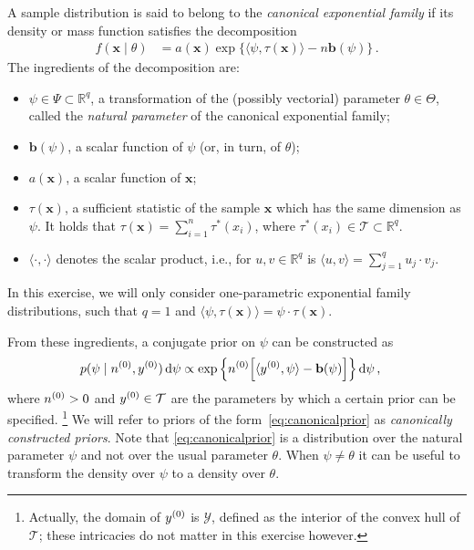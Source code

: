 \documentclass[12pt,a4paper	,twoside]{article}
\newcommand{\reals}{\mathbb{R}}
\newcommand{\dd}{\,\mathrm{d}}
\newcommand{\mbf}[1]{\mathbf{#1}}
\newcommand{\bs}[1]{\boldsymbol{#1}}
\renewcommand{\vec}[1]{{\bs#1}}
\begin{document}
A sample distribution is said to belong to the \emph{canonical exponential family}
if its density or mass function satisfies the decomposition
\begin{align}
f(\vec{x} \mid \theta) &= a(\vec{x})\exp\big\{\langle \psi, \tau(\vec{x}) \rangle - n \mbf{b}(\psi)\big\}\,.
\label{eq:expofam-sampledens}
\end{align}
The ingredients of the decomposition are:
\begin{itemize}
\item $\psi \in \Psi \subset \reals^q$, a transformation of the (possibly vectorial) parameter $\theta \in \Theta$,
called the \emph{natural parameter} of the canonical exponential family;
\item $\mbf{b}(\psi)$, a scalar function of $\psi$ (or, in turn, of $\theta$);
\item $a(\vec{x})$, a scalar function of $\vec{x}$;
\item $\tau(\vec{x})$, a sufficient statistic of the sample $\vec{x}$ which has the same dimension as $\psi$.
It holds that $\tau(\vec{x}) = \sum_{i=1}^n \tau^*(x_i)$,
where $\tau^*(x_i) \in \mathcal{T} \subset \reals^q$.
\item $\langle\cdot, \cdot\rangle$ denotes the scalar product,
i.e., for $u, v \in \reals^q$ is $\langle u, v\rangle = \sum_{j=1}^q u_j \cdot v_j$.
\end{itemize}
In this exercise, we will only consider one-parametric exponential family distributions,
such that $q=1$ and $\langle \psi, \tau(\vec{x}) \rangle = \psi \cdot \tau(\vec{x})$.

From these ingredients, a conjugate prior on $\psi$ can be constructed as
\begin{align}
p(\psi \mid \nz, \yz) \dd\psi
 &\propto \exp\Big\{ \nz \Big[ \langle \yz, \psi \rangle - \mbf{b}(\psi) \Big] \Big\} \dd\psi\,,
\label{eq:canonicalprior}
\end{align}
where $n^{(0)} > 0$ and $y^{(0)} \in \mathcal{T}$ are the parameters by which a certain prior can be specified.%
\footnote{Actually, the domain of $y^{(0)}$ is $\mathcal{Y}$, defined as the interior of the convex hull of $\mathcal{T}$;
these intricacies do not matter in this exercise however.}
We will refer to priors of the form~\eqref{eq:canonicalprior} as \emph{canonically constructed priors}.
Note that \eqref{eq:canonicalprior} is a distribution over the natural parameter $\psi$ and not over the usual parameter $\theta$.
When $\psi \neq \theta$ it can be useful to transform the density over $\psi$ to a density over $\theta$.
\end{document}
